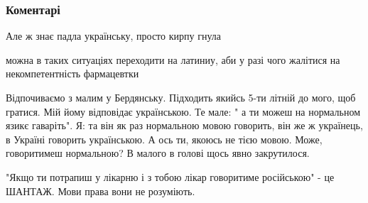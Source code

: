  
 
 
 
 
\subsubsection{Коментарі}

\begin{itemize}
 
Але ж знає падла українську, просто кирпу гнула

 
можна в таких ситуаціях переходити на латиниу, аби у разі чого жалітися на некомпетентність фармацевтки

 

Відпочиваємо з малим у Бердянську. Підходить якийсь 5-ти літній до мого, щоб
гратися. Мій йому відповідає українською. Те мале: " а ти можеш на нормальном
язикє гаваріть". Я: та він як раз нормальною мовою говорить, він же ж
українець, в Україні говорить українською. А ось ти, якоюсь не тією мовою.
Може, говоритимеш нормальною? В малого в голові щось явно закрутилося.


 
"Якщо ти потрапиш у лікарню і з тобою лікар говоритиме російською" - це ШАНТАЖ. Мови права вони не розуміють.


\end{itemize}
